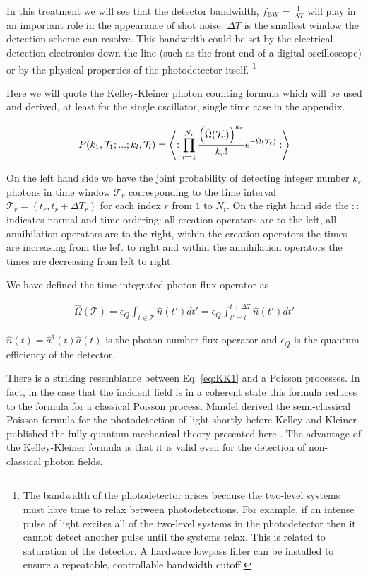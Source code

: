 \documentclass[12pt]{article}
\newcommand{\ep}{\epsilon}
\newcommand{\mc}[1]{\mathcal{#1}}
\begin{document}
In this treatment we will see that the detector bandwidth, $f_{\text{BW}} = \frac{1}{\Delta T}$ will play in an important role in the appearance of shot noise. $\Delta T$ is the smallest window the detection scheme can resolve. This bandwidth could be set by the electrical detection electronics down the line (such as the front end of a digital oscilloscope) or by the physical properties of the photodetector itself. \footnote{The bandwidth of the photodetector arises because the two-level systems must have time to relax between photodetections. For example, if an intense pulse of light excites all of the two-level systems in the photodetector then it cannot detect another pulse until the systems relax. This is related to saturation of the detector. A hardware lowpass filter can be installed to ensure a repeatable, controllable bandwidth cutoff.}

Here we will quote the Kelley-Kleiner photon counting formula which will be used and derived, at least for the single oscillator, single time case in the appendix.

\begin{align}
\label{eq:KK1}
P(k_1,\mc{T}_1;...;k_l,\mc{T}_l) = \Braket{:\prod_{r=1}^{N_t} \frac{\left(\hat{\Omega}(\mc{T}_r)\right)^{k_r}}{k_r!} e^{-\hat{\Omega}(\mc{T}_r)}:}
\end{align}

On the left hand side we have the joint probability of detecting integer number $k_r$ photons in time window $\mc{T}_r$ corresponding to the time interval $\mc{T}_r = (t_r, t_r+\Delta T_r)$ for each index $r$ from $1$ to $N_t$. On the right hand side the $::$ indicates normal and time ordering: all creation operators are to the left, all annihilation operators are to the right, within the creation operators the times are increasing from the left to right and within the annihilation operators the times are decreasing from left to right.

We have defined the time integrated photon flux operator as

\begin{align}
\hat{\Omega}(\mc{T}) = \ep_Q \int_{t\in\mc{T}} \hat{n}(t') dt' = \ep_Q \int_{t'=t}^{t+\Delta T} \hat{n}(t') dt'
\end{align}

 $\hat{n}(t) = \hat{a}^{\dag}(t) \hat{a}(t)$ is the photon number flux operator and $\ep_Q$ is the quantum efficiency of the detector.

There is a striking resemblance between Eq. \eqref{eq:KK1} and  a Poisson processes. In fact, in the case that the incident field is in a coherent state this formula reduces to the formula for a classical Poisson process. Mandel derived the semi-classical Poisson formula for the photodetection of light shortly before Kelley and Kleiner published the fully quantum mechanical theory presented here \cite{Mandel1958}. The advantage of the Kelley-Kleiner formula is that it is valid even for the detection of non-classical photon fields. 
\end{document}
